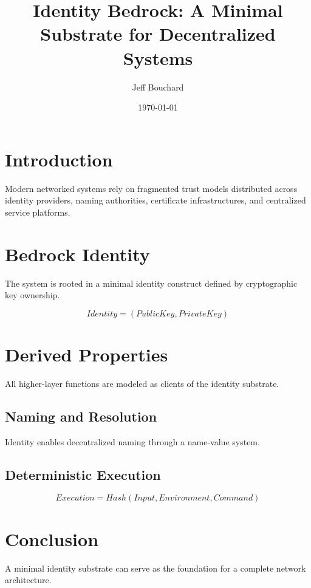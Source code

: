 \documentclass[11pt]{article}
\title{Identity Bedrock: A Minimal Substrate for Decentralized Systems}
\author{Jeff Bouchard}
\date{\today}
\begin{document}
\maketitle

\section{Introduction}

Modern networked systems rely on fragmented trust models distributed across identity providers, naming authorities, certificate infrastructures, and centralized service platforms.

\section{Bedrock Identity}

The system is rooted in a minimal identity construct defined by cryptographic key ownership.

\begin{equation}
Identity = (PublicKey, PrivateKey)
\end{equation}

\section{Derived Properties}

All higher-layer functions are modeled as clients of the identity substrate.

\subsection{Naming and Resolution}

Identity enables decentralized naming through a name-value system.

\subsection{Deterministic Execution}

\begin{equation}
Execution = Hash(Input, Environment, Command)
\end{equation}

\section{Conclusion}

A minimal identity substrate can serve as the foundation for a complete network architecture.
\end{document}
